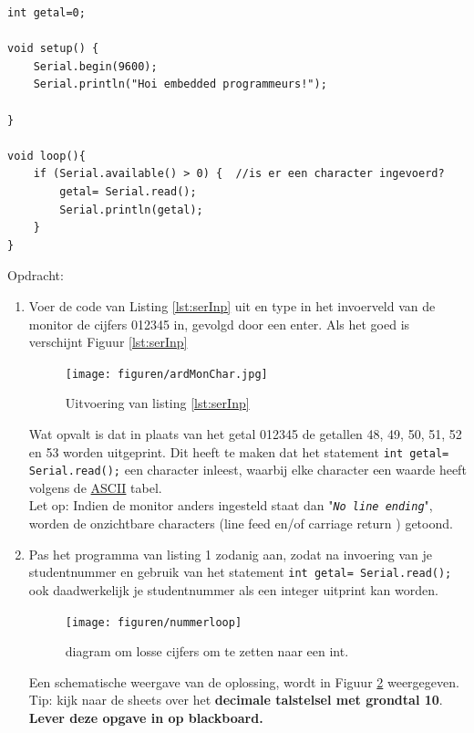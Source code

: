 \begin{lstlisting}[numbers=none ,caption= inlezen via de seriele poort.,label={lst:serInp}]	
int getal=0;

void setup() {  
	Serial.begin(9600);
	Serial.println("Hoi embedded programmeurs!");
	
}

void loop(){
	if (Serial.available() > 0) {  //is er een character ingevoerd?
		getal= Serial.read();
		Serial.println(getal);
	}
}
\end{lstlisting} 
 Opdracht:
 
  \begin{enumerate}
 	\item Voer de code van Listing \ref{lst:serInp} uit en type in het invoerveld van de monitor de cijfers 012345 in, gevolgd door een enter.
 	Als het goed is verschijnt Figuur \ref{lst:serInp}
 
 \begin{figure}[h!]
 	\captionsetup{justification=centering}
 	\texttt{[image: figuren/ardMonChar.jpg]}
 	\centering
	\caption{Uitvoering van listing \ref{lst:serInp}}
 		\label{fig:ardMonChr}
 \end{figure}
Wat opvalt is dat in plaats van het getal 012345 de getallen 48, 49, 50, 51, 52 en 53 worden uitgeprint. Dit heeft te maken dat het statement 
\texttt{int getal=\textcolor{BurntOrange}{ Serial.read}();} een character inleest, waarbij elke character een waarde heeft volgens de \href{https://nl.wikipedia.org/wiki/ASCII_(tekenset)}{ASCII} tabel.\\
Let op: Indien de monitor anders ingesteld staat dan "\texttt{\textit{No line ending}}", worden de onzichtbare characters (line feed en/of carriage return ) getoond. 
\item Pas het programma van listing 1 zodanig aan, zodat na invoering van je studentnummer en gebruik van het statement \texttt{int getal=\textcolor{BurntOrange}{ Serial.read}();} ook daadwerkelijk je studentnummer als een integer uitprint kan worden. 
 \begin{figure}[h!]
	\captionsetup{justification=centering}
	\texttt{[image: figuren/nummerloop]}
	\centering
	\caption{diagram om  losse cijfers om te zetten naar een int. }
	\label{fig:progFig}
\end{figure}
Een schematische weergave van de oplossing, wordt in Figuur \ref{fig:progFig} weergegeven.
\small{Tip: kijk naar de sheets over het \textbf{decimale talstelsel met grondtal 10}}.\\
\textbf{Lever deze opgave in op blackboard.}
\end{enumerate}

